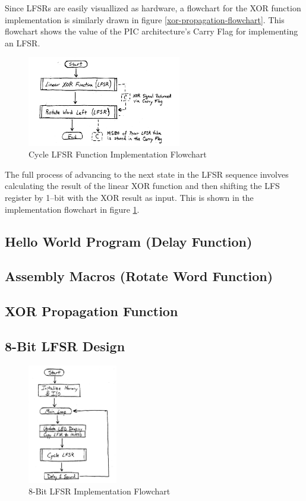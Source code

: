 \documentclass[11pt]{article}
\begin{document}
Since LFSRs are easily visuallized as hardware, a flowchart for the XOR function
implementation is similarly drawn in figure \ref{xor-propagation-flowchart}.
This flowchart shows the value of the PIC architecture's Carry Flag for implementing an LFSR.

\begin{figure}
	\centering
	\includegraphics[width=0.6\textwidth]{Figures/cycle-lfsr-flowchart.pdf}
	\caption{Cycle LFSR Function Implementation Flowchart}
	\label{cycle-lfsr-flowchart}
\end{figure}

The full process of advancing to the next state in the LFSR sequence involves
calculating the result of the linear XOR function and then shifting the LFS register
by 1--bit with the XOR result as input. This is shown in the implementation
flowchart in figure \ref{cycle-lfsr-flowchart}.
\subsection{Hello World Program (Delay Function)}

\subsection{Assembly Macros (Rotate Word Function)}

\subsection{XOR Propagation Function}

\subsection{8-Bit LFSR Design}

\begin{figure}
	\centering
	\includegraphics[width=0.35\textwidth]{Figures/8-bit-lfsr-flowchart.pdf}
	\caption{8-Bit LFSR Implementation Flowchart}
	\label{8-bit-lfsr-flowchart}
\end{figure}
\end{document}
